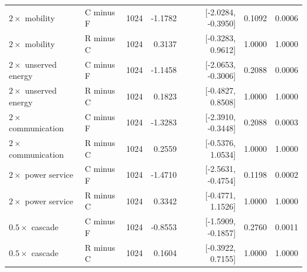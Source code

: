\begin{table}[t]
{\begin{tabular}{@{}llrrrrr@{}}
$2\times$ mobility & C minus F & 1024 & -1.1782 & [-2.0284, -0.3950] & 0.1092 & 0.0006 \\
$2\times$ mobility & R minus C & 1024 & 0.3137 & [-0.3283, 0.9612] & 1.0000 & 1.0000 \\
$2\times$ unserved energy & C minus F & 1024 & -1.1458 & [-2.0653, -0.3006] & 0.2088 & 0.0006 \\
$2\times$ unserved energy & R minus C & 1024 & 0.1823 & [-0.4827, 0.8508] & 1.0000 & 1.0000 \\
$2\times$ communication & C minus F & 1024 & -1.3283 & [-2.3910, -0.3448] & 0.2088 & 0.0003 \\
$2\times$ communication & R minus C & 1024 & 0.2559 & [-0.5376, 1.0534] & 1.0000 & 1.0000 \\
$2\times$ power service & C minus F & 1024 & -1.4710 & [-2.5631, -0.4754] & 0.1198 & 0.0002 \\
$2\times$ power service & R minus C & 1024 & 0.3342 & [-0.4771, 1.1526] & 1.0000 & 1.0000 \\
$0.5\times$ cascade & C minus F & 1024 & -0.8553 & [-1.5909, -0.1857] & 0.2760 & 0.0011 \\
$0.5\times$ cascade & R minus C & 1024 & 0.1604 & [-0.3922, 0.7155] & 1.0000 & 1.0000 \\

\bottomrule\end{tabular}}
\end{table}
